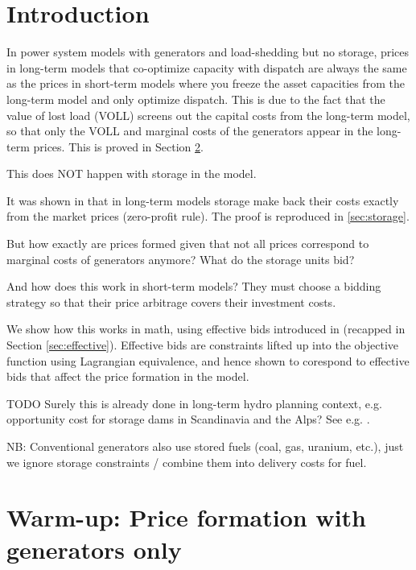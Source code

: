 \documentclass[final,3p,times]{elsarticle}
\begin{document}
\section{Introduction}

In power system models with generators and load-shedding but no
storage, prices in long-term models that co-optimize capacity with
dispatch are always the same as the prices in short-term models where
you freeze the asset capacities from the long-term model and only
optimize dispatch. This is due to the fact that the value of lost load
(VOLL) screens out the capital costs from the long-term model, so that
only the VOLL and marginal costs of the generators appear in the
long-term prices. This is proved in Section \ref{sec:generators}.

This does NOT happen with storage in the model.

It was shown in \cite{Brown2020} that in long-term models storage make
back their costs exactly from the market prices (zero-profit rule). The proof is reproduced in \ref{sec:storage}.

But how exactly are prices formed given that not all prices
correspond to marginal costs of generators anymore? What do the storage units
bid?

And how does this work in short-term models? They must choose a bidding strategy so that their price arbitrage covers their investment costs.

We show how this works in math, using effective bids introduced in \cite{Brown2020} (recapped in Section \ref{sec:effective}). Effective bids are constraints lifted up into the objective function using Lagrangian equivalence, and hence shown to corespond to effective bids that affect the price formation in the model.

TODO Surely this is already done in long-term hydro planning context, e.g. opportunity cost for storage dams in Scandinavia and the Alps? See e.g. \cite{horsley2016}.

NB: Conventional generators also use stored fuels (coal, gas, uranium, etc.), just we ignore storage constraints / combine them into delivery costs for fuel.

\section{Warm-up: Price formation with generators only}\label{sec:generators}
\end{document}
